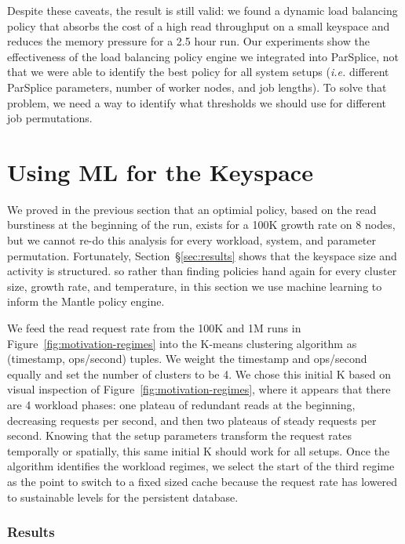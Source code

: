 Despite these caveats, the result is still valid: we found a dynamic load
balancing policy that absorbs the cost of a high read throughput on a small
keyspace and reduces the memory pressure for a 2.5 hour run. Our experiments
show the effectiveness of the load balancing policy engine we integrated into
ParSplice, not that we were able to identify the best policy for all system
setups ({\it i.e.} different ParSplice parameters, number of worker nodes, and
job lengths).  To solve that problem, we need a way to identify what thresholds
we should use for different job permutations.

\section{Using ML for the Keyspace}

We proved in the previous section that an optimial policy, based on the read
burstiness at the beginning of the run,  exists for a 100K growth rate on 8
nodes, but we cannot re-do this analysis for every workload, system, and
parameter permutation.  Fortunately, Section~\S\ref{sec:results} shows that the
keyspace size and activity is structured. so rather than finding policies hand
again for every cluster size, growth rate, and temperature, in this section we
use machine learning to inform the Mantle policy engine.

We feed the read request rate from the 100K and 1M runs in
Figure~\ref{fig:motivation-regimes} into the K-means clustering algorithm as
(timestamp, ops/second) tuples. We weight the timestamp and ops/second equally
and set the number of clusters to be 4. We chose this initial K  based on
visual inspection of Figure~\ref{fig:motivation-regimes}, where it appears that
there are 4 workload phases: one plateau of redundant reads at the beginning,
decreasing requests per second, and then two plateaus of steady requests per
second. Knowing that the setup parameters transform the request rates
temporally or spatially, this same initial K should work for all setups. Once
the algorithm identifies the workload regimes, we select the start of the third
regime as the point to switch to a fixed sized cache because the request rate has
lowered to sustainable levels for the persistent database.

\subsubsection*{Results}

